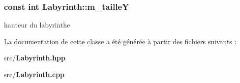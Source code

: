 \subsubsection[{m\-\_\-taille\-Y}]{\setlength{\rightskip}{0pt plus 5cm}const int Labyrinth\-::m\-\_\-taille\-Y\hspace{0.3cm}{\ttfamily [private]}}\label{class_labyrinth_ae656bd00c1402e153c89611b374a9567}


hauteur du labyrinthe 



La documentation de cette classe a été générée à partir des fichiers suivants \-:\begin{DoxyCompactItemize}
\item 
src/{\bf Labyrinth.\-hpp}\item 
src/{\bf Labyrinth.\-cpp}\end{DoxyCompactItemize}
